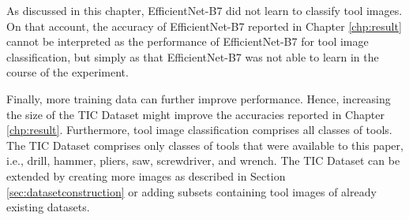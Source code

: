 \par%
As discussed in this chapter, EfficientNet-B7 did not learn to classify tool images. On that account, the accuracy of EfficientNet-B7 reported in Chapter \ref{chp:result} cannot be interpreted as the performance of EfficientNet-B7 for tool image classification, but simply as that EfficientNet-B7 was not able to learn in the course of the experiment.
\par %
Finally, more training data can further improve performance. \autocite{ElAmir.2020} Hence, increasing the size of the \ac{TIC Dataset} might improve the accuracies reported in Chapter \ref{chp:result}. Furthermore, tool image classification comprises all classes of tools. The \ac{TIC Dataset} comprises only classes of tools that were available to this paper, i.e., drill, hammer, pliers, saw, screwdriver, and wrench. The \ac{TIC Dataset} can be extended by creating more images as described in Section \ref{sec:datasetconstruction} or adding subsets containing tool images of already existing datasets.